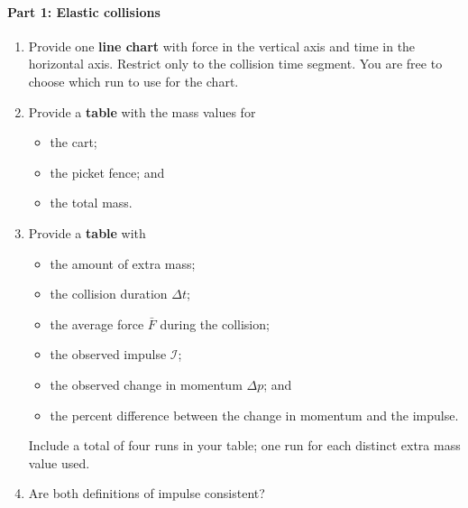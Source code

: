 \paragraph{Part 1: Elastic collisions}
%
\begin{enumerate}
    \item Provide one \textbf{line chart} with force in the vertical axis and time in the horizontal axis. Restrict only to the collision time segment. You are free to choose which run to use for the chart.
    \item Provide a \textbf{table} with the mass values for
    \begin{itemize}
        \item the cart;
        \item the picket fence; and
        \item the total mass.
    \end{itemize}
    \item Provide a \textbf{table} with
    \begin{itemize}
        \item the amount of extra mass;
        \item the collision duration $\Delta t$;
        \item the average force $\bar{F}$ during the collision;
        \item the observed impulse $\mathcal{I}$;
        \item the observed change in momentum $\Delta p$; and
        \item the percent difference between the change in momentum and the impulse.
    \end{itemize}
    Include a total of four runs in your table; one run for each distinct extra mass value used.
    \item Are both definitions of impulse consistent?
\end{enumerate}
%

